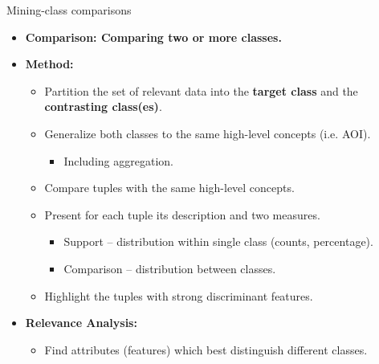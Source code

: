 \documentclass[aspectratio=169,t]{beamer}
\begin{document}
  { 
    \begin{frame}{Mining-class comparisons}
    \begin{itemize}
      \item \textbf{Comparison: Comparing two or more classes.}
      \item \textbf{Method:}
      \begin{itemize}
        \item Partition the set of relevant data into the \textbf{\color{airforceblue}target class} and the \textbf{\color{airforceblue}contrasting class(es)}.
        \item Generalize both classes to the same high-level concepts (i.e. AOI).
        \begin{itemize}
          \item Including aggregation.
        \end{itemize}
        \item Compare tuples with the same high-level concepts.
        \item Present for each tuple its description and two measures.
        \begin{itemize}
          \item Support -- distribution within single class (counts, percentage).
          \item Comparison -- distribution between classes.
        \end{itemize}
        \item Highlight the tuples with strong discriminant features.
      \end{itemize}
      \item \textbf{Relevance Analysis:}
      \begin{itemize}
        \item Find attributes (features) which best distinguish different classes.
      \end{itemize}
    \end{itemize}
    \end{frame}
  }
\end{document}
